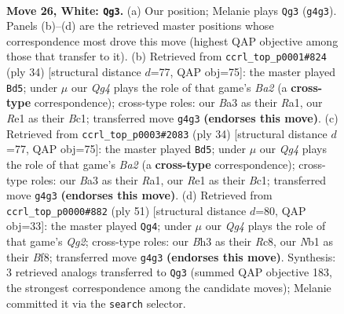 \documentclass[11pt]{article}
\begin{document}
\clearpage

\begin{figure}[p]\centering
\begin{subfigure}{0.46\textwidth}\centering
\resizebox{\linewidth}{!}{%
\newchessgame
\chessboard[
  setfen={r3r1k1/bp1b1pp1/pq2p3/3n3P/3p2Q1/BP5B/P2P1P1P/RN2RK2 w - - 3 26},
  showmover=false,
  pgfstyle=straightmove, color=movearrow, markmove={g4-g3}
]}
\caption{}
\end{subfigure}\hfill
\begin{subfigure}{0.46\textwidth}\centering
\resizebox{\linewidth}{!}{%
\newchessgame
\chessboard[
  setfen={r1bq1rk1/5ppp/p1np4/2p1p3/4P2b/P1P1N3/B4PPP/R1BQR1K1 w - - 0 18},
  showmover=false,
  pgfstyle=straightmove, color=movearrow, markmove={a2-d5}
]}
\caption{}
\end{subfigure}
\\[4pt]
\begin{subfigure}{0.46\textwidth}\centering
\resizebox{\linewidth}{!}{%
\newchessgame
\chessboard[
  setfen={r1bq1rk1/5ppp/p1np4/2p1p3/4P2b/P1P1N3/B4PPP/R1BQR1K1 w - - 0 18},
  showmover=false,
  pgfstyle=straightmove, color=movearrow, markmove={a2-d5}
]}
\caption{}
\end{subfigure}\hfill
\begin{subfigure}{0.46\textwidth}\centering
\resizebox{\linewidth}{!}{%
\newchessgame
\chessboard[
  setfen={2r1kbr1/1p4q1/2n1p3/1NPpPp1p/5B2/4QbP1/P1B2P2/2R2RK1 b - - 0 26},
  showmover=false,
  pgfstyle=straightmove, color=movearrow, markmove={g7-g4}
]}
\caption{}
\end{subfigure}
\caption{\textbf{Move 26, White: \texttt{Qg3}.} (a) Our position; Melanie plays \texttt{Qg3} (\texttt{g4g3}). Panels (b)--(d) are the retrieved master positions whose correspondence most drove this move (highest QAP objective among those that transfer to it). (b) Retrieved from \texttt{ccrl\_top\_p0001\#824} (ply 34) [structural distance $d$=77, QAP obj=75]: the master played \texttt{Bd5}; under $\mu$ our \emph{Qg4} plays the role of that game's \emph{Ba2} (a \textbf{cross-type} correspondence); cross-type roles: our \emph{B}a3 as their \emph{R}a1, our \emph{R}e1 as their \emph{B}c1; transferred move \texttt{g4g3} \textbf{(endorses this move)}. (c) Retrieved from \texttt{ccrl\_top\_p0003\#2083} (ply 34) [structural distance $d$=77, QAP obj=75]: the master played \texttt{Bd5}; under $\mu$ our \emph{Qg4} plays the role of that game's \emph{Ba2} (a \textbf{cross-type} correspondence); cross-type roles: our \emph{B}a3 as their \emph{R}a1, our \emph{R}e1 as their \emph{B}c1; transferred move \texttt{g4g3} \textbf{(endorses this move)}. (d) Retrieved from \texttt{ccrl\_top\_p0000\#882} (ply 51) [structural distance $d$=80, QAP obj=33]: the master played \texttt{Qg4}; under $\mu$ our \emph{Qg4} plays the role of that game's \emph{Qg2}; cross-type roles: our \emph{B}h3 as their \emph{R}c8, our \emph{N}b1 as their \emph{B}f8; transferred move \texttt{g4g3} \textbf{(endorses this move)}. Synthesis: 3 retrieved analogs transferred to \texttt{Qg3} (summed QAP objective 183, the strongest correspondence among the candidate moves); Melanie committed it via the \texttt{search} selector.}
\label{fig:thought-m50}
\end{figure}
\end{document}

